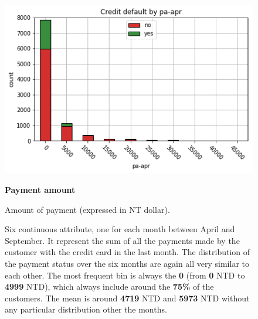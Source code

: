 \smallskip
\begin{figure}[h]
  \begin{minipage}[h]{.50\textwidth}
    \includegraphics[width=.95\textwidth]{img/ch2/payment_amount_1}
  \end{minipage}
  \begin{minipage}[h]{.50\textwidth}
        {\Large \textbf{Payment amount}}
        
        Amount of payment (expressed in NT dollar).
        
        Six continuous attribute, one for each month between April and September.
        It represent the sum of all the payments made by the customer with the credit card in the last month. The distribution of the payment status over the six months are again all very similar to each other. The most frequent bin is always the \textbf{0} (from \textbf{0} NTD to \textbf{4999} NTD), which always include around the \textbf{75\%} of the customers. The mean is around \textbf{4719} NTD and \textbf{5973} NTD without any particular distribution other the months.
  \end{minipage}
\end{figure}
\smallskip

